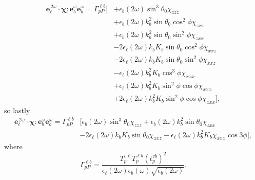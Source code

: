 \begin{equation*}
\begin{split}
\mathbf{e}^{\,2\omega}_{\ell}\cdot
\boldsymbol{\chi}:\mathbf{e}^{\omega}_{b}\mathbf{e}^{\omega}_{b} = 
\Gamma^{\ell b}_{pP}
\bigg[
&+ \epsilon_{b}(2\omega)\sin^{3}\theta_{0}\chi_{zzz}\\
&+ \epsilon_{b}(2\omega)k^{2}_{b}\sin\theta_{0}\cos^{2}\phi\chi_{zxx}\\
&+ \epsilon_{b}(2\omega)k^{2}_{b}\sin\theta_{0}\sin^{2}\phi\chi_{zxx}\\
&- 2\epsilon_{\ell}(2\omega)k_{b}K_{b}\sin\theta_{0}\cos^{2}\phi\chi_{xxz}\\
&- 2\epsilon_{\ell}(2\omega)k_{b}K_{b}\sin\theta_{0}\sin^{2}\phi\chi_{xxz}\\
&- \epsilon_{\ell}(2\omega)k^{2}_{b}K_{b}\cos^{3}\phi\chi_{xxx}\\
&+ \epsilon_{\ell}(2\omega)k^{2}_{b}K_{b}\sin^{2}\phi\cos\phi\chi_{xxx}\\
&+ 2\epsilon_{\ell}(2\omega)k^{2}_{b}K_{b}\sin^{2}\phi\cos\phi\chi_{xxx}
\bigg],
\end{split}
\end{equation*}
so lastly
\begin{equation*}
\begin{split}
\mathbf{e}^{\,2\omega}_{\ell}\cdot
\boldsymbol{\chi}:\mathbf{e}^{\omega}_{b}\mathbf{e}^{\omega}_{b} = 
\Gamma^{\ell b}_{pP}&
\bigg[
  \epsilon_{b}(2\omega)\sin^{3}\theta_{0}\chi_{zzz}
+ \epsilon_{b}(2\omega)k^{2}_{b}\sin\theta_{0}\chi_{zxx}\\
&- 2\epsilon_{\ell}(2\omega)k_{b}K_{b}\sin\theta_{0}\chi_{xxz}
- \epsilon_{\ell}(2\omega)k^{2}_{b}K_{b}\chi_{xxx}\cos3\phi
\bigg],
\end{split}
\end{equation*}
where
\begin{equation*}
\Gamma^{\ell b}_{pP}=
\frac{T^{v\ell}_{p}T^{\ell b}_{p}\left(t^{vb}_{p}\right)^{2}}
  {\epsilon_{\ell}({2\omega})\epsilon_{b}(\omega)\sqrt{\epsilon_{b}(2\omega)}}.
\end{equation*}
